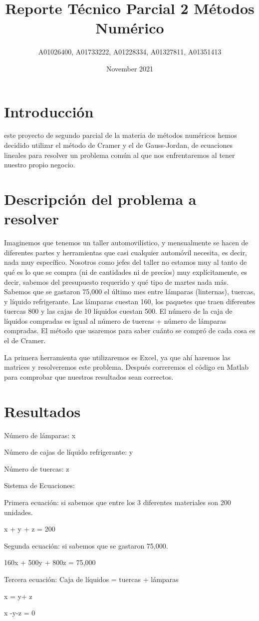 \documentclass{article}
\title{Reporte Técnico Parcial 2 Métodos Numérico}
\author{A01026400, A01733222, A01228334, A01327811, A01351413 }
\date{November 2021}
\begin{document}
\maketitle

\section{Introducción}
\itemEn este proyecto de segundo parcial de la materia de métodos numéricos hemos decidido utilizar el método de Cramer y el de Gauss-Jordan, de ecuaciones lineales para resolver un problema común al que nos enfrentaremos al tener nuestro propio negocio.

\section{Descripción del problema a resolver}
\item Imaginemos que tenemos un taller automovilístico, y mensualmente se hacen de diferentes partes y herramientas que casi cualquier automóvil necesita, es decir, nada muy específico. Nosotros como jefes del taller no estamos muy al tanto de qué es lo que se compra (ni de cantidades ni de precios) muy explícitamente, es decir, sabemos del presupuesto requerido y qué tipo de martes nada más. Sabemos que se gastaron 75,000 el último mes entre lámparas (linternas), tuercas, y líquido refrigerante. Las lámparas cuestan 160, los paquetes que traen diferentes tuercas 800 y las cajas de 10 líquidos cuestan 500. El número de la caja de líquidos compradas es igual al número de tuercas + número de lámparas compradas. El método que usaremos para saber cuánto se compró de cada cosa es el de Cramer. 

La primera herramienta que utilizaremos es Excel, ya que ahí haremos las matrices y resolveremos este problema. Después correremos el código en Matlab para comprobar que nuestros resultados sean correctos. 

\section{Resultados}
\item Número de lámparas: x
\item Número de cajas de líquido refrigerante: y 
\item Número de tuercas: z


\item Sistema de Ecuaciones: 
\item Primera ecuación: si sabemos que entre los 3 diferentes materiales son 200 unidades. 
\item x + y + z = 200
\item Segunda ecuación: si sabemos que se gastaron 75,000. 
\item 160x + 500y + 800z = 75,000
\item Tercera ecuación: Caja de líquidos = tuercas + lámparas
\item x = y+ z
\item x -y-z = 0
\end{document}
